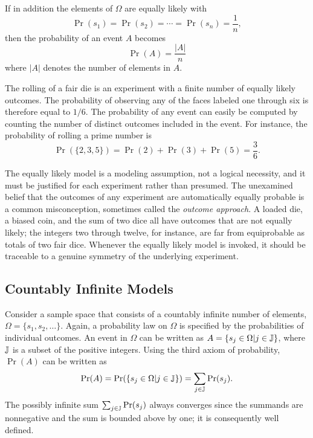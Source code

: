 If in addition the elements of $\Omega$ are equally likely with
\begin{equation*}
\Pr (s_1) = \Pr (s_2) = \cdots = \Pr (s_n) = \frac{1}{n} ,
\end{equation*}
then the probability of an event $A$ becomes
\begin{equation} \label{equation:ProbEquiProbableOutcomes}
\Pr (A) = \frac{ |A| }{n}
\end{equation}
where $|A|$ denotes the number of elements in $A$.

\begin{example}
The rolling of a fair die is an experiment with a finite number of equally likely outcomes.
The probability of observing any of the faces labeled one through six is therefore equal to $1/6$.
The probability of any event can easily be computed by counting the number of distinct outcomes included in the event.
For instance, the probability of rolling a prime number is
\begin{equation*}
\Pr ( \{ 2, 3, 5 \} )
= \Pr (2) + \Pr(3) + \Pr(5) = \frac{3}{6} .
\end{equation*}
\end{example}


The equally likely model is a modeling assumption, not a logical necessity, and it must be justified for each experiment rather than presumed.
The unexamined belief that the outcomes of any experiment are automatically equally probable is a common misconception, sometimes called the \emph{outcome approach}.
A loaded die, a biased coin, and the sum of two dice all have outcomes that are not equally likely;
the integers two through twelve, for instance, are far from equiprobable as totals of two fair dice.
Whenever the equally likely model is invoked, it should be traceable to a genuine symmetry of the underlying experiment.


\subsection{Countably Infinite Models}

Consider a sample space that consists of a countably infinite number of elements, $\Omega = \{ s_1, s_2, \ldots \}$.
Again, a probability law on $\Omega$ is specified by the probabilities of individual outcomes.
An event in $\Omega$ can be written as $A = \{ s_j \in \Omega | j \in \mathbb{J} \}$, where $\mathbb{J}$ is a subset of the positive integers.
Using the third axiom of probability, $\Pr (A)$ can be written as
\begin{equation*}
\Pr (A)
= \Pr ( \{ s_j \in \Omega | j \in \mathbb{J} \} )
= \sum_{j \in \mathbb{J}} \Pr (s_j) .
\end{equation*}
The possibly infinite sum $\sum_{j \in \mathbb{J}} \Pr (s_j)$ always converges since the summands are nonnegative and the sum is bounded above by one; it is consequently well defined.

